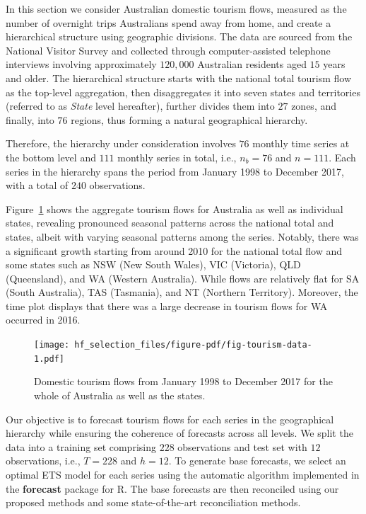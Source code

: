 \documentclass[11pt,a4paper,]{article}
\begin{document}
In this section we consider Australian domestic tourism flows, measured
as the number of overnight trips Australians spend away from home, and
create a hierarchical structure using geographic divisions. The data are
sourced from the National Visitor Survey and collected through
computer-assisted telephone interviews involving approximately
\(120,000\) Australian residents aged \(15\) years and older. The
hierarchical structure starts with the national total tourism flow as
the top-level aggregation, then disaggregates it into seven states and
territories (referred to as \emph{State} level hereafter), further
divides them into \(27\) zones, and finally, into \(76\) regions, thus
forming a natural geographical hierarchy.

Therefore, the hierarchy under consideration involves \(76\) monthly
time series at the bottom level and \(111\) monthly series in total,
i.e., \(n_b=76\) and \(n=111\). Each series in the hierarchy spans the
period from January 1998 to December 2017, with a total of \(240\)
observations.

Figure~\ref{fig-tourism-data} shows the aggregate tourism flows for
Australia as well as individual states, revealing pronounced seasonal
patterns across the national total and states, albeit with varying
seasonal patterns among the series. Notably, there was a significant
growth starting from around 2010 for the national total flow and some
states such as NSW (New South Wales), VIC (Victoria), QLD (Queensland),
and WA (Western Australia). While flows are relatively flat for SA
(South Australia), TAS (Tasmania), and NT (Northern Territory).
Moreover, the time plot displays that there was a large decrease in
tourism flows for WA occurred in 2016.

\begin{figure}

{\centering \texttt{[image: hf\_selection\_files/figure-pdf/fig-tourism-data-1.pdf]}

}

\caption{\label{fig-tourism-data}Domestic tourism flows from January
1998 to December 2017 for the whole of Australia as well as the states.}

\end{figure}

Our objective is to forecast tourism flows for each series in the
geographical hierarchy while ensuring the coherence of forecasts across
all levels. We split the data into a training set comprising \(228\)
observations and test set with \(12\) observations, i.e., \(T=228\) and
\(h=12\). To generate base forecasts, we select an optimal ETS model for
each series using the automatic algorithm implemented in the
\textbf{forecast} package for R. The base forecasts are then reconciled
using our proposed methods and some state-of-the-art reconciliation
methods.
\end{document}

